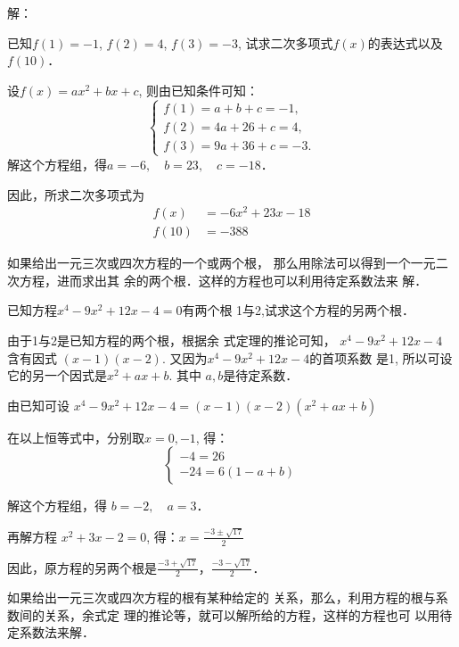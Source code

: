 解：


\begin{example}
    已知$f(1)=-1$, $f(2)=4$, $f(3)=-3$,
试求二次多项式$f(x)$的表达式以及$f(10)$．
\end{example}

\begin{solution}
    设$f(x)=ax^2+bx+c$,
则由已知条件可知：
\[\begin{cases}
    f(1)=a+b+c=-1,\\
f(2)=4a+26+c=4,\\
f(3)=9a+36+c=-3.
\end{cases}\]
解这个方程组，得$a=-6,\quad b=23,\quad c=-18$．

因此，所求二次多项式为
\[\begin{split}
    f(x)&=-6x^2+23x-18\\
f(10)&=-388
\end{split}\]
\end{solution}

如果给出一元三次或四次方程的一个或两个根，
那么用除法可以得到一个一元二次方程，进而求出其
余的两个根．这样的方程也可以利用待定系数法来
解．


\begin{example}
   已知方程$x^4-9x^2+12x-4=0$有两个根
1与2,试求这个方程的另两个根． 
\end{example}

\begin{analyze}
由于1与2是已知方程的两个根，根据余
式定理的推论可知，
$x^4-9x^2+12x-4$
含有因式
$(x-1)(x-2)$. 又因为$x^4-9x^2+12x-4$的首项系数
是1, 所以可设它的另一个因式是$x^2+ax+b$. 其中
$a,b$是待定系数．
\end{analyze}

\begin{solution}
    由已知可设
$x^4-9x^2+12x-4=(x-1)(x-2)(x^2+ax+b)$

在以上恒等式中，分别取$x=0,-1$, 得：
\[\begin{cases}
    -4=26\\
-24=6(1-a+b)
\end{cases}\]

解这个方程组，得 $b=-2,\quad a=3$．

再解方程 $x^2+3x-2=0$, 得：$x=\frac{-3\pm\sqrt{17}}{2}$

因此，原方程的另两个根是$\frac{-3+\sqrt{17}}{2}$，$\frac{-3-\sqrt{17}}{2}$．
\end{solution}

如果给出一元三次或四次方程的根有某种给定的
关系，那么，利用方程的根与系数间的关系，余式定
理的推论等，就可以解所给的方程，这样的方程也可
以用待定系数法来解．    

